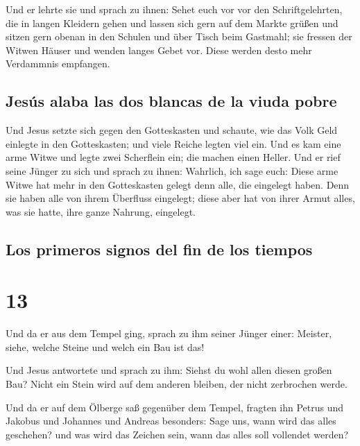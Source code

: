  Und er lehrte sie und sprach zu ihnen: Sehet euch vor
vor den Schriftgelehrten, die in langen Kleidern gehen und lassen sich
gern auf dem Markte grüßen  und sitzen gern obenan in den
Schulen und über Tisch beim Gastmahl;  sie fressen der
Witwen Häuser und wenden langes Gebet vor. Diese werden desto mehr
Verdammnis empfangen.

\hypertarget{jesuxfas-alaba-las-dos-blancas-de-la-viuda-pobre}{%
\subsection{Jesús alaba las dos blancas de la viuda
pobre}\label{jesuxfas-alaba-las-dos-blancas-de-la-viuda-pobre}}

 Und Jesus setzte sich gegen den Gotteskasten und
schaute, wie das Volk Geld einlegte in den Gotteskasten; und viele
Reiche legten viel ein.  Und es kam eine arme Witwe und
legte zwei Scherflein ein; die machen einen Heller.  Und
er rief seine Jünger zu sich und sprach zu ihnen: Wahrlich, ich sage
euch: Diese arme Witwe hat mehr in den Gotteskasten gelegt denn alle,
die eingelegt haben.  Denn sie haben alle von ihrem
Überfluss eingelegt; diese aber hat von ihrer Armut alles, was sie
hatte, ihre ganze Nahrung, eingelegt.

\hypertarget{los-primeros-signos-del-fin-de-los-tiempos}{%
\subsection{Los primeros signos del fin de los
tiempos}\label{los-primeros-signos-del-fin-de-los-tiempos}}

\hypertarget{section-12}{%
\section{13}\label{section-12}}

 Und da er aus dem Tempel ging, sprach zu ihm seiner
Jünger einer: Meister, siehe, welche Steine und welch ein Bau ist das!

 Und Jesus antwortete und sprach zu ihm: Siehst du wohl
allen diesen großen Bau? Nicht ein Stein wird auf dem anderen bleiben,
der nicht zerbrochen werde.

 Und da er auf dem Ölberge saß gegenüber dem Tempel,
fragten ihn Petrus und Jakobus und Johannes und Andreas besonders:
 Sage uns, wann wird das alles geschehen? und was wird das
Zeichen sein, wann das alles soll vollendet werden?

